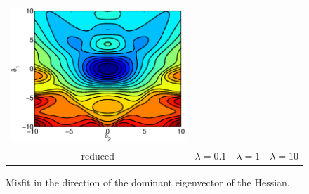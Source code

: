 \documentclass{iopart}
\begin{document}
\begin{figure}
\begin{tabular}{cccc}
\includegraphics[scale=.2]{./figs/2D_exp0_l}\\
{\small reduced}&{\small $\lambda=0.1$}&{\small $\lambda=1$}&{\small $\lambda=10$}\\
\end{tabular}
\caption{Misfit in the direction of the dominant eigenvector of the Hessian.}
\label{fig:2D_exp0b}
\end{figure}
\end{document}
